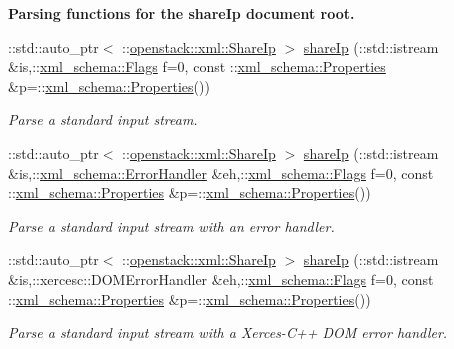 \begin{Indent}{\bf Parsing functions for the shareIp document root.}
\begin{DoxyCompactItemize}
::std::auto\_\-ptr$<$ ::\hyperlink{classopenstack_1_1xml_1_1ShareIp}{openstack::xml::ShareIp} $>$ \hyperlink{namespaceopenstack_1_1xml_ab351bcfab7ad570e504dbef631789dac}{shareIp} (::std::istream \&is,::\hyperlink{namespacexml__schema_affb4c227cbd9aa7453dd1dc5a1401943}{xml\_\-schema::Flags} f=0, const ::\hyperlink{namespacexml__schema_ad27ce19a7ee1d3b1064092648898f64c}{xml\_\-schema::Properties} \&p=::\hyperlink{namespacexml__schema_ad27ce19a7ee1d3b1064092648898f64c}{xml\_\-schema::Properties}())
\begin{DoxyCompactList}\small\item\em Parse a standard input stream. \item\end{DoxyCompactList}\item 
::std::auto\_\-ptr$<$ ::\hyperlink{classopenstack_1_1xml_1_1ShareIp}{openstack::xml::ShareIp} $>$ \hyperlink{namespaceopenstack_1_1xml_aaf7161f362b00e1a253cdd65d84d3246}{shareIp} (::std::istream \&is,::\hyperlink{namespacexml__schema_ab1c9361bfd3b404eaabf0c31eded79dc}{xml\_\-schema::ErrorHandler} \&eh,::\hyperlink{namespacexml__schema_affb4c227cbd9aa7453dd1dc5a1401943}{xml\_\-schema::Flags} f=0, const ::\hyperlink{namespacexml__schema_ad27ce19a7ee1d3b1064092648898f64c}{xml\_\-schema::Properties} \&p=::\hyperlink{namespacexml__schema_ad27ce19a7ee1d3b1064092648898f64c}{xml\_\-schema::Properties}())
\begin{DoxyCompactList}\small\item\em Parse a standard input stream with an error handler. \item\end{DoxyCompactList}\item 
::std::auto\_\-ptr$<$ ::\hyperlink{classopenstack_1_1xml_1_1ShareIp}{openstack::xml::ShareIp} $>$ \hyperlink{namespaceopenstack_1_1xml_a5eb6699a7856642b2e5ed1dbf590c063}{shareIp} (::std::istream \&is,::xercesc::DOMErrorHandler \&eh,::\hyperlink{namespacexml__schema_affb4c227cbd9aa7453dd1dc5a1401943}{xml\_\-schema::Flags} f=0, const ::\hyperlink{namespacexml__schema_ad27ce19a7ee1d3b1064092648898f64c}{xml\_\-schema::Properties} \&p=::\hyperlink{namespacexml__schema_ad27ce19a7ee1d3b1064092648898f64c}{xml\_\-schema::Properties}())
\begin{DoxyCompactList}\small\item\em Parse a standard input stream with a Xerces-\/C++ DOM error handler. \item\end{DoxyCompactList}\item 

\end{DoxyCompactItemize}
\end{Indent}
